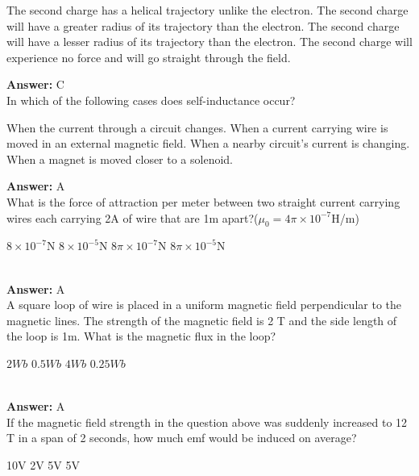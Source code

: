\documentclass[12pt,addpoints]{exam}
\begin{document}
{{{\begin{questions}
					\begin{choices}
						\choice The second charge has a helical trajectory unlike the electron.
						\choice The second charge will have a greater radius of its trajectory than the electron.
						\choice The second charge will have a lesser radius of its trajectory than the electron.
						\choice The second charge will experience no force and will go straight through the field.
					\end{choices}
					\textbf{Answer:} C\\ 
					\question In which of the following cases does self-inductance occur? 
					\begin{choices}
						\choice When the current through a circuit changes.
						\choice When a current carrying wire is moved in an external magnetic field.
						\choice When a nearby circuit's current is changing.
						\choice When a magnet is moved closer to a solenoid.
					\end{choices}
					\textbf{Answer:} A\\ 
					\question What is the force of attraction per meter between two straight current carrying wires each carrying 2A of wire that are 1m apart?($\mu_0=4\pi\times10^{-7}$H/m)\\
					\begin{oneparchoices}
						\choice $8\times10^{-7}$N 
						\choice $8\times10^{-5}$N
						\choice $8\pi\times10^{-7}$N
						\choice $8\pi\times10^{-5}$N
					\end{oneparchoices}
					\\ \textbf{Answer:} A\\ 
					\question A square loop of wire is placed in a uniform magnetic field perpendicular to the magnetic lines. The strength of the magnetic field is 2 T and the side length of the loop is 1m. What is the magnetic flux in the loop?\\
					\begin{oneparchoices}
						\choice $2Wb$
						\choice $0.5Wb$
						\choice $4Wb$
						\choice $0.25Wb$
					\end{oneparchoices}
					\\ \textbf{Answer:} A\\ 
					\question  If the magnetic field strength in the question above was suddenly increased to 12 T in a span of 2 seconds, how much emf would be induced on average? \\
					\begin{oneparchoices}
						\choice 10V
						\choice 2V
						\choice 5V
						\choice 5V

\end{oneparchoices}
\end{questions}}}}
\end{document}
